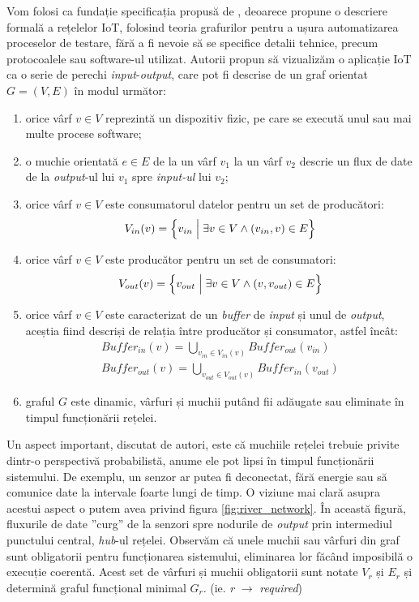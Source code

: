 Vom folosi ca fundație specificația propusă de \citet{Paduraru2021}, deoarece propune o descriere formală a rețelelor IoT, folosind teoria grafurilor pentru a ușura automatizarea proceselor de testare, fără a fi nevoie să se specifice detalii tehnice, precum protocoalele sau software-ul utilizat. Autorii propun să vizualizăm o aplicație IoT ca o serie de perechi \textit{input}-\textit{output}, care pot fi descrise de un graf orientat $G = (V, E)$ în modul următor:

\begin{enumerate}
    \item orice vârf $v \in V$ reprezintă un dispozitiv fizic, pe care se execută unul sau mai multe procese software;
    \item o muchie orientată $e \in E$ de la un vârf $v_1$ la un vârf $v_2$ descrie un flux de date de la \textit{output}-ul lui $v_1$ spre \textit{input-ul} lui $v_2$;
    \item orice vârf $v \in V$ este consumatorul datelor pentru un set de producători: 
        \begin{gather*}
            V_{in}(v) = \Big{\{} v_{in} \; \Big{|} \; \exists v \in V \land (v_{in}, v) \in E \Big{\}}
        \end{gather*}
    \item orice vârf $v \in V$ este producător pentru un set de consumatori:
        \begin{gather*}
            V_{out}(v) = \Big{\{} v_{out} \; \Big{|} \; \exists v \in V \land (v, v_{out}) \in E \Big{\}}
        \end{gather*}
    \item orice vârf $v \in V$ este caracterizat de un \textit{buffer} de \textit{input} și unul de \textit{output}, aceștia fiind descriși de relația între producător și consumator, astfel încât: 
        \begin{gather*}
            Buffer_{in}(v) = \bigcup_{v_{in} \in V_{in}(v)} Buffer_{out}(v_{in}) \\
            Buffer_{out}(v) = \bigcup_{v_{out} \in V_{out}(v)} Buffer_{in}(v_{out})
        \end{gather*}
    \item graful $G$ este dinamic, vârfuri și muchii putând fii adăugate sau eliminate în timpul funcționării rețelei.
\end{enumerate}

Un aspect important, discutat de autori, este că muchiile rețelei trebuie privite dintr-o perspectivă probabilistă, anume ele pot lipsi în timpul funcționării sistemului. De exemplu, un senzor ar putea fi deconectat, fără energie sau să comunice date la intervale foarte lungi de timp. O viziune mai clară asupra acestui aspect o putem avea privind figura \ref{fig:river_network}. În această figură, fluxurile de date ”curg” de la senzori spre nodurile de \textit{output} prin intermediul punctului central, \textit{hub}-ul rețelei. Observăm că unele muchii sau vârfuri din graf sunt obligatorii pentru funcționarea sistemului, eliminarea lor făcând imposibilă o execuție coerentă. Acest set de vârfuri și muchii obligatorii sunt notate $V_r$ și $E_r$ și determină graful funcțional minimal $G_r$. (ie. \textit{r} $\rightarrow$ \textit{required})

